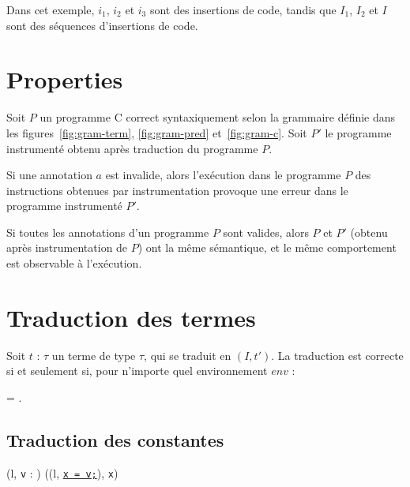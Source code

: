 Dans cet exemple, $i_1$, $i_2$ et $i_3$ sont des insertions de code, tandis que
$I_1$, $I_2$ et $I$ sont des séquences d'insertions de code.


\section{Properties}
\label{sec:properties}

\begin{notation}
  Soit $P$ un programme C correct syntaxiquement selon la grammaire définie dans
  les figures~\ref{fig:gram-term}, \ref{fig:gram-pred} et~\ref{fig:gram-c}.
  Soit $P'$ le programme instrumenté obtenu après traduction du programme $P$.
\end{notation}



\begin{theorem}
  Si une annotation $a$ est invalide, alors l'exécution dans le programme $P$
  des instructions obtenues par instrumentation provoque une erreur dans le
  programme instrumenté $P'$.
\end{theorem}

\begin{theorem}
  Si toutes les annotations d'un programme $P$ sont valides, alors $P$ et $P'$
  (obtenu après instrumentation de $P$) ont la même sémantique, et le même
  comportement est observable à l'exécution.
\end{theorem}



\section{Traduction des termes}
\label{sec:term-translation}


\begin{lemma}\label{lem:term-correct}
  Soit $t$ : $\tau$ un terme de type $\tau$, qui se traduit en $(I, t')$.
  La traduction est correcte si et seulement si, pour n'importe quel
  environnement $env$ :

   = .
\end{lemma}


\subsection{Traduction des constantes}

{
  { (l, \mbox{\lstinline'v'} : ) 
    ((l, \Zinit\underline{\mbox{\lstinline'x = v;'}}), \mbox{\lstinline'x'}) }
}

